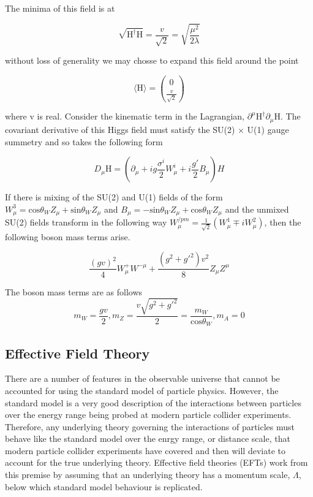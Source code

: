 The minima of this field is at 

\begin{equation}
\sqrt{\text{H}^{\dagger}\text{H}} = \frac{v}{\sqrt{2}} = \sqrt{\frac{\mu^{2}}{2\lambda}}
\end{equation}

without loss of generality we may chosse to expand this field around the point

\begin{equation}
\langle \text{H} \rangle = \binom{0}{\frac{v}{\sqrt{2}}}
\end{equation}

where v is real.  Consider the kinematic term in the Lagrangian, $\partial^{\mu} \text{H}^{\dagger} \partial_{\mu} \text{H}$.  The covariant derivative of this Higgs field must satisfy the SU(2) $\times$ U(1) gauge summetry and so takes the following form

\begin{equation}
D_{\mu} \text{H} = (\partial_{\mu} + ig\frac{\sigma^{i}}{2}W^{i}_{\mu} + i\frac{g'}{2}B_{\mu})H
\end{equation}

If there is mixing of the SU(2) and U(1) fields of the form $W^{3}_{\mu} = \text{cos}{\theta_{W}}Z_{\mu} + \text{sin}{\theta_{W}}Z_{\mu}$ and $B_{\mu} = -\text{sin}{\theta_{W}}Z_{\mu} + \text{cos}{\theta_{W}}Z_{\mu}$ and the unmixed SU(2) fields transform in the following way $W^{/pm}_{\mu} = \frac{1}{\sqrt{2}}(W^{1}_{\mu} \mp i W^{2}_{\mu})$, then the following boson mass terms arise.

\begin{equation}
\frac{(gv)^{2}}{4} W^{+}_{\mu} W^{-\mu} + \frac{(g^{2} + g'^{2})v^{2}}{8} Z_{\mu} Z^{\mu}
\end{equation}

The boson mass terms are as follows
\begin{equation}
m_{W} = \frac{gv}{2}, m_{Z} = \frac{v\sqrt{g^{2} + g'^{2}}}{2} = \frac{m_{W}}{\text{cos}{\theta_{W}}}, m_{A} = 0
\end{equation}

\subsection{Effective Field Theory}

There are a number of features in the observable universe that cannot be accounted for using the standard model of particle physics.  However, the standard model is a very good description of the interactions between particles over the energy range being probed at modern particle collider experiments.  Therefore, any underlying theory governing the interactions of particles must behave like the standard model over the enrgy range, or distance scale, that modern particle collider experiments have covered and then will deviate to account for the true underlying theory.  Effective field theories (EFTs) work from this premise by assuming that an underlying theory has a momentum scale, $\Lambda$, below which standard model behaviour is replicated.  

